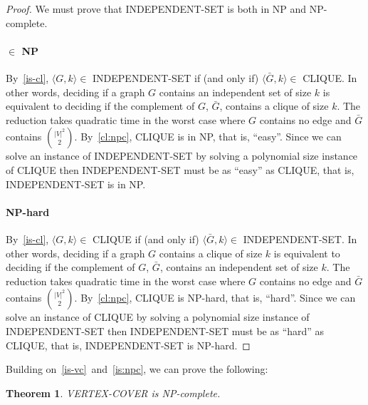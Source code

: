 \documentclass{article}
\newcommand{\theoremname}{Theorem}
\newtheorem{theorem}{\theoremname}
\newcommand{\card}[1]{|#1|}
\begin{document}
\begin{proof}
  We must prove that INDEPENDENT-SET is both in NP and NP-complete.
  \paragraph{$\in$ NP}
  By~\ref{is-cl}, $\langle G,k \rangle \in$ INDEPENDENT-SET if (and only if)
  $\langle \bar{G},k\rangle \in$ CLIQUE.
  In other words, deciding if a graph $G$ contains an independent set of size $k$ is
  equivalent to deciding if the complement of $G$, $\bar{G}$, contains a
  clique of size $k$. The reduction takes quadratic time in the worst
  case where $G$ contains no edge and $\bar{G}$ contains $\binom{\card{V}^2}{2}$.
  By~\ref{cl:npc}, CLIQUE is in NP, that is, ``easy''. Since
  we can solve an instance of INDEPENDENT-SET by solving a polynomial size instance of
  CLIQUE then INDEPENDENT-SET must be as ``easy'' as CLIQUE, that
  is, INDEPENDENT-SET is in NP.

  \paragraph{NP-hard}
  By~\ref{is-cl}, $\langle G,k \rangle \in$ CLIQUE if (and only if)
  $\langle \bar{G},k\rangle \in$ INDEPENDENT-SET.
  In other words, deciding if a graph $G$ contains a clique of size $k$ is
  equivalent to deciding if the complement of $G$, $\bar{G}$, contains an
  independent set of size $k$. The reduction takes quadratic time in the worst
  case where $G$ contains no edge and $\bar{G}$ contains $\binom{\card{V}^2}{2}$.
  By~\ref{cl:npc}, CLIQUE is NP-hard, that is, ``hard''. Since
  we can solve an instance of CLIQUE by solving a polynomial size instance of
  INDEPENDENT-SET then INDEPENDENT-SET must be as ``hard'' as CLIQUE, that
  is, INDEPENDENT-SET is NP-hard.
\end{proof}

Building on~\ref{is-vc}~and~\ref{is:npc}, we can prove the following:
\begin{theorem}\label{vc:npc}
VERTEX-COVER is NP-complete.
\end{theorem}
\end{document}
